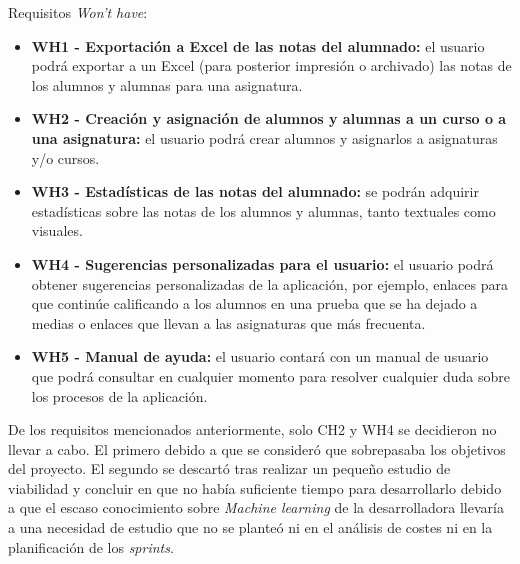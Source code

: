 Requisitos \textit{Won't have}:
\begin{itemize}
	\item \textbf{WH1 - Exportación a Excel de las notas del alumnado:} el usuario podrá exportar a un Excel (para posterior impresión o archivado) las notas de los alumnos y alumnas para una asignatura.
	\item \textbf{WH2 - Creación y asignación de alumnos y alumnas a un curso o a una asignatura:} el usuario podrá crear alumnos y asignarlos a asignaturas y/o cursos.
	\item \textbf{WH3 - Estadísticas de las notas del alumnado:} se podrán adquirir estadísticas sobre las notas de los alumnos y alumnas, tanto textuales como visuales.
	\item \textbf{WH4 - Sugerencias personalizadas para el usuario:} el usuario podrá obtener sugerencias personalizadas de la aplicación, por ejemplo, enlaces para que continúe calificando a los alumnos en una prueba que se ha dejado a medias o enlaces que llevan a las asignaturas que más frecuenta.
	\item \textbf{WH5 - Manual de ayuda:} el usuario contará con un manual de usuario que podrá consultar en cualquier momento para resolver cualquier duda sobre los procesos de la aplicación.
\end{itemize}


De los requisitos mencionados anteriormente, solo CH2 y WH4 se decidieron no llevar a cabo. El primero debido a que se consideró que sobrepasaba los objetivos del proyecto. El segundo se descartó tras realizar un pequeño estudio de viabilidad y concluir en que no había suficiente tiempo para desarrollarlo debido a que el escaso conocimiento sobre \textit{Machine learning} de la desarrolladora llevaría a una necesidad de estudio que no se planteó ni en el análisis de costes ni en la planificación de los \textit{sprints}.




